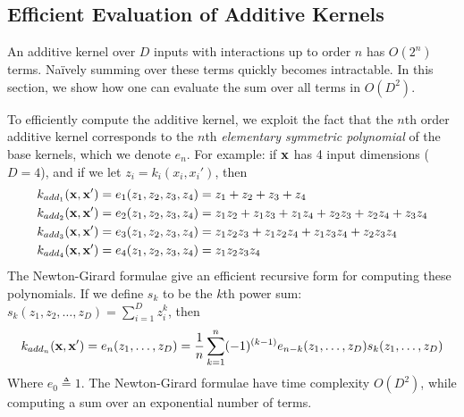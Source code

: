 \subsection{Efficient Evaluation of Additive Kernels}
An additive kernel over $D$ inputs with interactions up to order $n$ has $O(2^n)$ terms.
Na\"{i}vely summing over these terms quickly becomes intractable.
In this section, we show how one can evaluate the sum over all terms in $O(D^2)$.

To efficiently compute the additive kernel, we exploit the fact that the $n$th order additive kernel corresponds to the $n$th \textit{elementary symmetric polynomial} \citep{macdonald1998symmetric}
of the base kernels, which we denote $e_n$.
For example:  if $\bf x$ has 4 input dimensions ($D = 4$), and if we let $z_i = k_i(x_i,x_i')$, then
%
\begin{align}
k_{add_1}({\bf x, x'}) & = e_1( z_1, z_2, z_3, z_4 ) = z_1 + z_2 + z_3 + z_4 \\
k_{add_2}({\bf x, x'}) & = e_2( z_1, z_2, z_3, z_4 ) = z_1 z_2 + z_1 z_3 + z_1z_4 + z_2 z_3 + z_2 z_4 + z_3 z_4 \\
k_{add_3}({\bf x, x'}) & = e_3( z_1, z_2, z_3, z_4 ) = z_1 z_2 z_3 + z_1 z_2 z_4 + z_1 z_3 z_4 + z_2 z_3 z_4 \\
k_{add_4}({\bf x, x'}) & = e_4( z_1, z_2, z_3, z_4 ) = z_1 z_2 z_3 z_4
\end{align}
%
The Newton-Girard formulae give an efficient recursive form for computing these polynomials.
If we define $s_k$ to be the $k$th power sum: $s_k(z_1,z_2,\dots,z_D) = \sum_{i=1}^Dz_i^k$, then
%
\begin{align}
k_{add_n}({\bf x, x'}) = e_n(z_1,\dots,z_D) = \frac{1}{n} \sum_{k=1}^n (-1)^{(k-1)} e_{n-k}(z_1,\dots,z_D)s_k(z_1,\dots,z_D)
\end{align}
%
Where $e_0 \triangleq 1$.  The Newton-Girard formulae have time complexity $O( D^2 )$, while computing a sum over an exponential number of terms.

